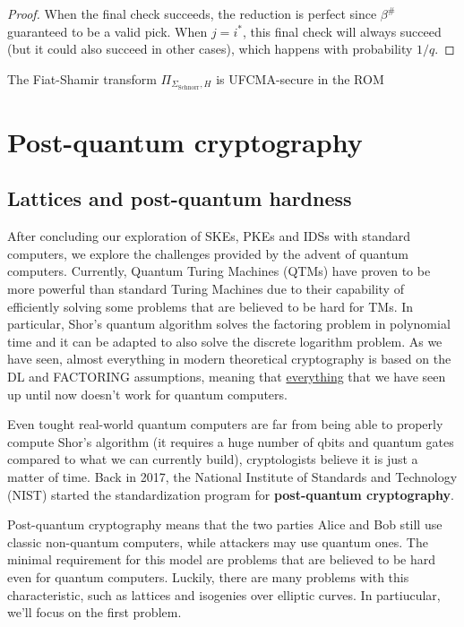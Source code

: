 \documentclass[a4paper, 12pt]{report}
\begin{document}
\begin{proof}
        When the final check succeeds, the reduction is perfect since $\beta^{\#}$ guaranteed to be a valid pick. When $j = i^*$, this final check will always succeed (but it could also succeed in other cases), which happens with probability $1/q$.
    \end{proof}

    \begin{framedcor}{}
        The Fiat-Shamir transform $\Pi_{\Sigma_{\text{Schnorr}}, H}$ is UFCMA-secure in the ROM
    \end{framedcor}

    \chapter{Post-quantum cryptography}

    \section{Lattices and post-quantum hardness}

    After concluding our exploration of SKEs, PKEs and IDSs with standard computers, we explore the challenges provided by the advent of quantum computers. Currently, Quantum Turing Machines (QTMs) have proven to be more powerful than standard Turing Machines due to their capability of efficiently solving some problems that are believed to be hard for TMs. In particular, Shor's quantum algorithm solves the factoring problem in polynomial time and it can be adapted to also solve the discrete logarithm problem. As we have seen, almost everything in modern theoretical cryptography is based on the DL and FACTORING assumptions, meaning that \underline{everything} that we have seen up until now doesn't work for quantum computers.

    Even tought real-world quantum computers are far from being able to properly compute Shor's algorithm (it requires a huge number of qbits and quantum gates compared to what we can currently build), cryptologists believe it is just a matter of time. Back in 2017, the National Institute of Standards and Technology (NIST) started the standardization program for \textbf{post-quantum cryptography}.

    Post-quantum cryptography means that the two parties Alice and Bob still use classic non-quantum computers, while attackers may use quantum ones. The minimal requirement for this model are problems that are believed to be hard even for quantum computers. Luckily, there are many problems with this characteristic, such as lattices and isogenies over elliptic curves. In partiucular, we'll focus on the first problem.
\end{document}
